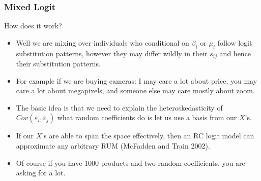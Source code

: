 \documentclass[xcolor=pdftex,dvipsnames,table,mathserif,aspectratio=169]{beamer}
\begin{document}
\begin{frame}
\frametitle{Mixed Logit}
How does it work?
 \begin{itemize}
\item Well we are mixing over individuals who conditional on $\beta_i$ or $\mu_i$ follow logit substitution patterns, however they may differ wildly in their $s_{ij}$ and hence their substitution patterns.
\item For example if we are buying cameras: I may care a lot about price, you may care a lot about megapixels, and someone else may care mostly about zoom.
\item The basic idea is that we need to explain the heteroskedasticity of $Cov(\varepsilon_i, \varepsilon_j)$ what random coefficients do is let us use a basis from our $X$'s.
\item If our $X$'s are able to span the space effectively, then an RC logit model can approximate any arbitrary RUM (McFadden and Train 2002). 
\item Of course if you have 1000 products and two random coefficients, you are asking for a lot.
 \end{itemize}
\end{frame}


%
\end{document}
